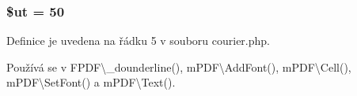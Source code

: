 \hypertarget{courier_8php_aadd3f841051043ee58e587e840e8dd0b}{
\subsubsection[{\$ut}]{\setlength{\rightskip}{0pt plus 5cm}\$ut = 50}}\label{courier_8php_aadd3f841051043ee58e587e840e8dd0b}


Definice je uvedena na řádku 5 v souboru courier.\-php.



Používá se v F\-P\-D\-F\textbackslash{}\-\_\-dounderline(), m\-P\-D\-F\textbackslash{}\-Add\-Font(), m\-P\-D\-F\textbackslash{}\-Cell(), m\-P\-D\-F\textbackslash{}\-Set\-Font() a m\-P\-D\-F\textbackslash{}\-Text().

